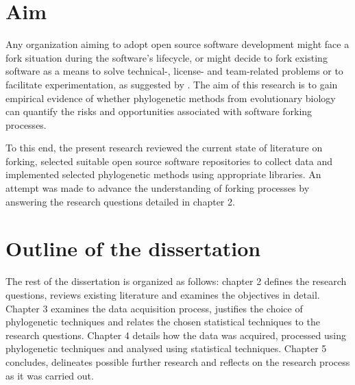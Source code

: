 
\section{Aim}
Any organization aiming to adopt open source software development might face a fork situation during the software's lifecycle, or might decide to fork existing software as a means to solve technical-, license- and team-related problems or to facilitate experimentation, as suggested by \citet{Robles2012a}. The aim of this research is to gain empirical evidence of whether phylogenetic methods from evolutionary biology can quantify the risks and opportunities associated with software forking processes.

To this end, the present research reviewed the current state of literature on forking, selected suitable open source software repositories to collect data and implemented selected phylogenetic methods using appropriate libraries. An attempt was made to advance the understanding of forking processes by answering the research questions detailed in chapter 2.


\section{Outline of the dissertation}
The rest of the dissertation is organized as follows: chapter 2 defines the research questions, reviews existing literature and examines the objectives in detail. Chapter 3 examines the data acquisition process, justifies the choice of phylogenetic techniques and relates the chosen statistical techniques to the research questions. Chapter 4 details how the data was acquired, processed using phylogenetic techniques and analysed using statistical techniques. Chapter 5 concludes, delineates possible further research and reflects on the research process as it was carried out.
